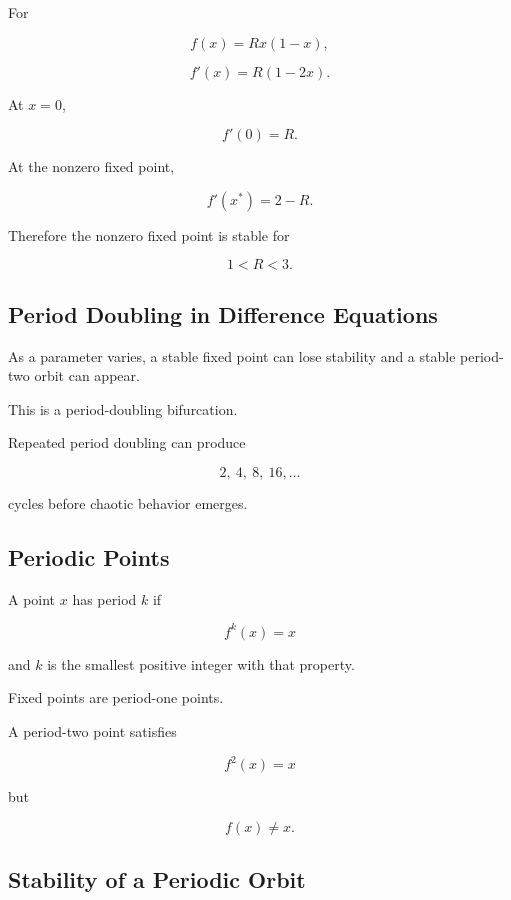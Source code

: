 For

\[
f(x)=Rx(1-x),
\]

\[
f'(x)=R(1-2x).
\]

At \(x=0\),

\[
\boxed{
f'(0)=R.
}
\]

At the nonzero fixed point,

\[
\boxed{
f'(x^*)=2-R.
}
\]

Therefore the nonzero fixed point is stable for

\[
\boxed{
1<R<3.
}
\]

\subsection{Period Doubling in Difference Equations}
\label{subsec:difference-period-doubling}

As a parameter varies, a stable fixed point can lose stability and a
stable period-two orbit can appear.

This is a period-doubling bifurcation.

Repeated period doubling can produce

\[
\boxed{
2,\ 4,\ 8,\ 16,\ldots
}
\]

cycles before chaotic behavior emerges.

\subsection{Periodic Points}
\label{subsec:difference-periodic-points}

A point \(x\) has period \(k\) if

\[
\boxed{
f^k(x)=x
}
\]

and \(k\) is the smallest positive integer with that property.

Fixed points are period-one points.

A period-two point satisfies

\[
\boxed{
f^2(x)=x
}
\]

but

\[
\boxed{
f(x)\neq x.
}
\]

\subsection{Stability of a Periodic Orbit}
\label{subsec:difference-periodic-orbit-stability}

